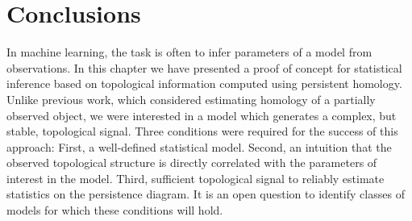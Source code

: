 \section{Conclusions}
\label{parametric_inference:sec:discussion}

In machine learning, the task is often to infer parameters of a model from observations.
In this chapter we have presented a proof of concept for statistical inference based on topological information computed using persistent homology.
Unlike previous work, which considered estimating homology of a partially observed object, we were interested in a model which generates a complex, but stable, topological signal.
Three conditions were required for the success of this approach:
First, a well-defined statistical model.
Second, an intuition that the observed topological structure is directly correlated with the parameters of interest in the model.
Third, sufficient topological signal to reliably estimate statistics on the persistence diagram.
It is an open question to identify classes of models for which these conditions will hold.
